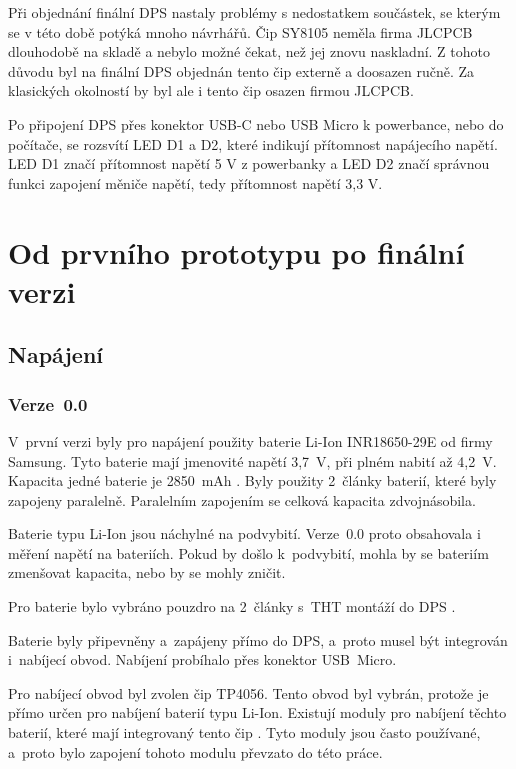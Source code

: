   Při objednání finální DPS nastaly problémy s nedostatkem součástek, se kterým se v této době potýká mnoho návrhářů. Čip SY8105 neměla %
  firma JLCPCB dlouhodobě na skladě a nebylo možné čekat, než jej znovu naskladní. Z tohoto důvodu byl na finální DPS objednán tento čip 
  externě a doosazen ručně. Za klasických okolností by byl ale i tento čip osazen firmou JLCPCB.

  Po připojení DPS přes konektor USB-C nebo USB Micro k powerbance, nebo do počítače, se rozsvítí LED D1 a D2, které indikují přítomnost 
  napájecího napětí. LED D1 značí přítomnost napětí 5 V z powerbanky a LED D2 značí správnou funkci zapojení měniče napětí, tedy přítomnost 
  napětí 3,3 V.

  \chapter{Od prvního prototypu po finální verzi} %
  \section{Napájení}
  \subsection{Verze~0.0}
  V~první verzi byly pro napájení použity baterie Li-Ion INR18650-29E od firmy Samsung. Tyto baterie mají jmenovité napětí 3,7~V, 
  při plném nabití až 4,2~V. Kapacita jedné baterie je 2850~mAh \cite{18650}. Byly použity 2~články baterií, které byly zapojeny paralelně. 
  Paralelním zapojením se celková kapacita zdvojnásobila.

  Baterie typu Li-Ion jsou náchylné na podvybití. Verze~0.0 proto obsahovala i měření napětí na bateriích. Pokud by došlo k~podvybití, mohla 
  by se bateriím zmenšovat kapacita, nebo by se mohly zničit. 

  Pro baterie bylo vybráno pouzdro na 2~články s~THT montáží do DPS \cite{18650_pouzdro}.

  Baterie byly připevněny a~zapájeny přímo do DPS, a~proto musel být integrován i~nabíjecí obvod. Nabíjení probíhalo přes konektor USB~Micro.

  Pro nabíjecí obvod byl zvolen čip TP4056. Tento obvod byl vybrán, protože je přímo určen pro nabíjení baterií typu Li-Ion. Existují 
  moduly pro nabíjení těchto baterií, které mají integrovaný tento čip \cite{Nabijeci_modul}. Tyto moduly jsou často používané, a~proto 
  bylo zapojení tohoto modulu převzato do této práce. 

